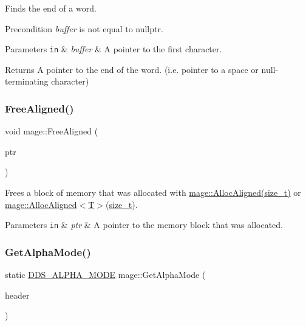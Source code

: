 Finds the end of a word.

\begin{DoxyPrecond}{Precondition}
{\itshape buffer} is not equal to {\ttfamily nullptr}. 
\end{DoxyPrecond}

\begin{DoxyParams}[1]{Parameters}
\mbox{\tt in}  & {\em buffer} & A pointer to the first character. \\
\hline
\end{DoxyParams}
\begin{DoxyReturn}{Returns}
A pointer to the end of the word. (i.\+e. pointer to a space or null-\/terminating character) 
\end{DoxyReturn}
\hypertarget{namespacemage_a2ea8b0ebc056a664eadff3512c1cade4}{}\label{namespacemage_a2ea8b0ebc056a664eadff3512c1cade4} 
\subsubsection{\texorpdfstring{Free\+Aligned()}{FreeAligned()}}
{\footnotesize\ttfamily void mage\+::\+Free\+Aligned (\begin{DoxyParamCaption}\item[{void $\ast$}]{ptr }\end{DoxyParamCaption})\hspace{0.3cm}{\ttfamily [noexcept]}}

Frees a block of memory that was allocated with \hyperlink{namespacemage_a99a1bea696ddb7fdbf981edfa6e3cf30}{mage\+::\+Alloc\+Aligned(size\+\_\+t)} or \hyperlink{namespacemage_a99a1bea696ddb7fdbf981edfa6e3cf30}{mage\+::\+Alloc\+Aligned$<$\+T$>$(size\+\_\+t)}.


\begin{DoxyParams}[1]{Parameters}
\mbox{\tt in}  & {\em ptr} & A pointer to the memory block that was allocated. \\
\hline
\end{DoxyParams}
\hypertarget{namespacemage_afcc0891e1660f8457696cb30f4ee518a}{}\label{namespacemage_afcc0891e1660f8457696cb30f4ee518a} 
\subsubsection{\texorpdfstring{Get\+Alpha\+Mode()}{GetAlphaMode()}}
{\footnotesize\ttfamily static \hyperlink{namespacemage_a0c586a2bad862f4858900ca121ca80c2}{D\+D\+S\+\_\+\+A\+L\+P\+H\+A\+\_\+\+M\+O\+DE} mage\+::\+Get\+Alpha\+Mode (\begin{DoxyParamCaption}\item[{\+\_\+\+In\+\_\+ const \hyperlink{structmage_1_1_d_d_s___h_e_a_d_e_r}{D\+D\+S\+\_\+\+H\+E\+A\+D\+ER} $\ast$}]{header }\end{DoxyParamCaption})\hspace{0.3cm}{\ttfamily [static]}}

